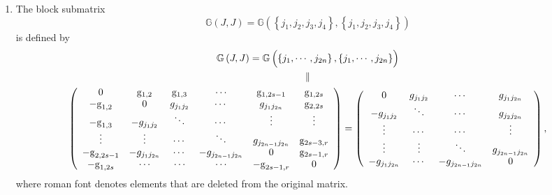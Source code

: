 \documentclass[aps,preprint]{revtex4}%
\begin{document}
\begin{enumerate}
\item The block submatrix%
\begin{equation}
\mathbb{G}\left(  J,J\right)  =\mathbb{G}\left(  \left\{  j_{1},j_{2}%
,j_{3},j_{4}\right\}  ,\left\{  j_{1},j_{2},j_{3},j_{4}\right\}  \right)
\end{equation}
is defined by
\begin{gather}
\mathbb{G}\left(  J,J\right)  =\mathbb{G}\left(  \overset{}{\left\{
j_{1},\cdots,j_{2n}\right\}  ,\left\{  j_{1},\cdots,j_{2n}\right\}  }\right)
\\
\parallel\\
\left(
\begin{array}
[c]{cccccc}%
\mathrm{0} & \mathrm{g}_{1,2} & \mathrm{g}_{1,3} & \mathrm{\cdots} &
\mathrm{g}_{1,2s-1} & \mathrm{g}_{1,2s}\\
\mathrm{-g}_{1,2} & 0 & g_{j_{1}j_{2}} & \cdots & g_{j_{1}j_{2n}} &
\mathrm{g}_{2,2s}\\
\mathrm{-g}_{1,3} & -g_{j_{1}j_{2}} & \ddots & \cdots & \vdots &
\mathrm{\vdots}\\
\mathrm{\vdots} & \vdots & \cdots & \ddots & g_{j_{2n-1}j_{2n}} &
\mathrm{g}_{2s-3,r}\\
\mathrm{-g}_{2,2s-1} & -g_{j_{1}j_{2n}} & \cdots & -g_{j_{2n-1}j_{2n}} & 0 &
\mathrm{g}_{2s-1,r}\\
\mathrm{-g}_{1,2s} & \mathrm{\cdots} & \mathrm{\cdots} & \mathrm{\cdots} &
\mathrm{-g}_{2s-1,r} & \mathrm{0}%
\end{array}
\right)  =\left(
\begin{array}
[c]{cccc}%
0 & g_{j_{1}j_{2}} & \cdots & g_{j_{1}j_{2n}}\\
-g_{j_{1}j_{2}} & \ddots & \cdots & g_{j_{2}j_{2n}}\\
\vdots & \cdots & \cdots & \vdots\\
\vdots & \vdots & \ddots & g_{j_{2n-1}j_{2n}}\\
-g_{j_{1}j_{2n}} & \cdots & -g_{j_{2n-1}j_{2n}} & 0
\end{array}
\right)  ,
\end{gather}
where roman font denotes elements that are deleted from the original matrix.


\end{enumerate}
\end{document}
